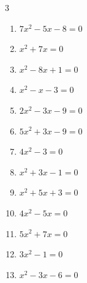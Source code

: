 \begin{multicols}{3}
\begin{enumerate}
  \item $7x^{2}-5x-8=0$


  \item $x^{2}+7x=0$

        \phantom{$\displaystyle x=0, \; -7$}

\columnbreak %

\resetques

  \item $x^{2}-8x+1=0$


  \item $x^{2}-x-3=0$


  \item $2x^{2}-3x-9=0$


  \item $5x^{2}+3x-9=0$


  \item $4x^{2}-3=0$


  \item $x^{2}+3x-1=0$


  \item $x^{2}+5x+3=0$


\columnbreak %

  \item $4x^{2}-5x=0$


  \item $5x^{2}+7x=0$


  \item $3x^{2}-1=0$


  \item $x^{2}-3x-6=0$


\end{enumerate}
\end{multicols}
